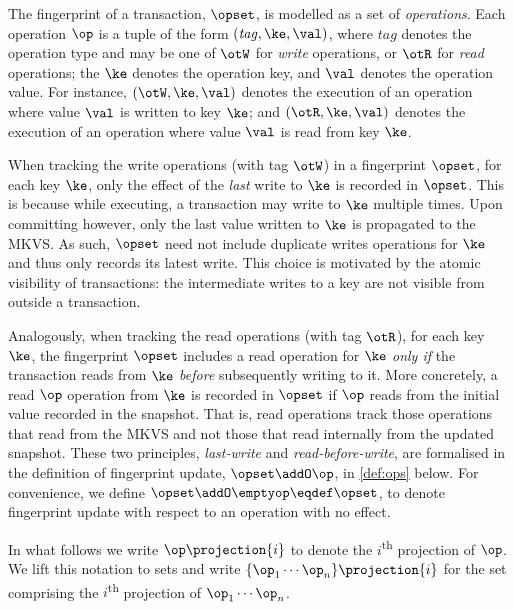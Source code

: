 The fingerprint of a transaction, $\opset$, is modelled as a set of \emph{operations}. 
Each operation $\op$ is a tuple of the form $(\mathit{tag}, \ke, \val)$, where $\mathit{tag}$ denotes the operation type and may be one of $\otW$ for \emph{write} operations, or $\otR$ for \emph{read} operations; 
the $\ke$ denotes the operation key, and  $\val$ denotes the operation value. 
For instance, $(\otW, \ke, \val)$ denotes the execution of an operation where value $\val$ is written to key $\ke$; and
$(\otR, \ke, \val)$ denotes the execution of an operation where value $\val$ is read from key $\ke$.


When tracking the write operations (with tag $\otW$) in a fingerprint $\opset$, for each key $\ke$, only the effect of the \emph{last} write to $\ke$ is recorded in $\opset$. 
This is because while executing, a transaction may write to $\ke$ multiple times. Upon committing however, only the last value written to $\ke$ is propagated to the MKVS. 
As such, $\opset$ need not include duplicate writes operations for  $\ke$ and thus only records its latest write. 
This choice is motivated by the atomic visibility of transactions: the intermediate writes to a key are not visible from outside a transaction.


Analogously, when tracking the read operations (with tag $\otR$), for each key $\ke$, the fingerprint $\opset$ includes a read operation for $\ke$ \emph{only if} the transaction reads from $\ke$ \emph{before} subsequently writing to it.
More concretely, a read $\op$ operation from $\ke$ is recorded in $\opset$ if $\op$ reads from the initial value recorded in the snapshot. %
That is, read operations track those operations that read from the MKVS and not those that read internally from the updated snapshot.
These two principles, \emph{last-write} and \emph{read-before-write}, are formalised in the definition of {fingerprint update}, $\opset \addO \op$,  in \cref{def:ops} below. 
For convenience, we define $\opset \addO \emptyop \eqdef \opset$, to denote fingerprint update with respect to an operation with no effect.


In what follows we write $\op \projection{i}$ to denote the $i$\textsuperscript{th} projection of $\op$. 
We lift this notation to sets and write \eg $\{\op_1 \cdots \op_n\}\projection{i}$ for the set comprising the $i$\textsuperscript{th} projection of $\op_1 \cdots \op_n$. 






